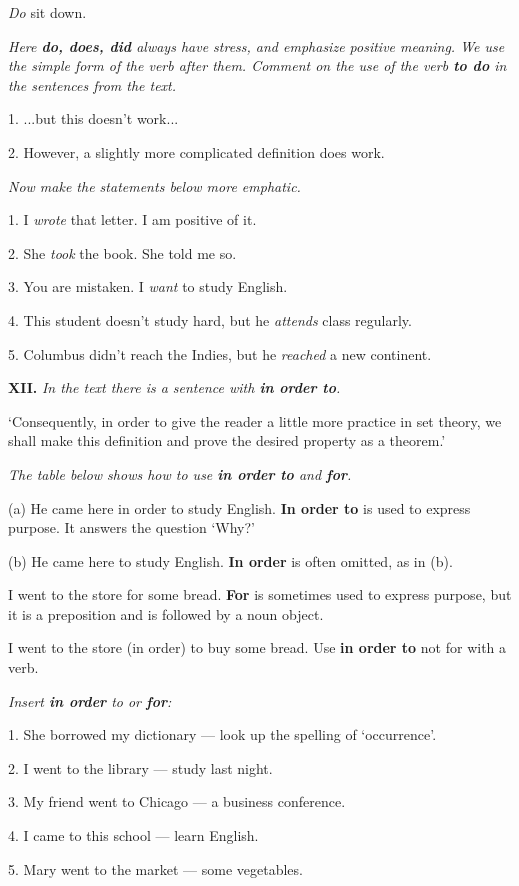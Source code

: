 \documentclass[a4paper]{article}
\newcommand{\ETask}[2]{\medskip\par\textbf{#1.} \textit{#2}\par}
\begin{document}
\textit{Do} sit down.

\textit{Here \textbf{do, does, did} always have stress, and emphasize positive meaning. We use the simple form of the verb after them.
Comment on the use of the verb \textbf{to do} in the sentences from the text.}

1. ...but this doesn't work...

2. However, a slightly more complicated definition does work.

\textit{Now make the statements below more emphatic.}

1. I \textit{wrote} that letter. I am positive of it.

2. She \textit{took} the book. She told me so.

3. You are mistaken. I \textit{want} to study English.

4. This student doesn't study hard, but he \textit{attends} class regularly.

5. Columbus didn't reach the Indies, but he \textit{reached} a new continent.

\ETask{XII}{In the text there is a sentence with \textbf{in order to}.}
`Consequently, in order to give the reader a little more practice in set theory, we shall make this definition and prove the
desired property as a theorem.'

\textit{The table below shows how to use \textbf{in order to} and \textbf{for}.}

(a) He came here in order to study English. \textbf{In order to} is used to express purpose. It answers the question `Why?'

(b) He came here to study English. \textbf{In order} is often omitted, as in (b).

I went to the store for some bread. \textbf{For} is sometimes used to express purpose, but it is a preposition and is
followed by a noun object.

I went to the store (in order) to buy some bread. Use \textbf{in order to} not for with a verb.

\textit{Insert \textbf{in order} to or \textbf{for}:}

1. She borrowed my dictionary --- look up the spelling of `occurrence'.

2. I went to the library --- study last night.

3. My friend went to Chicago --- a business conference.

4. I came to this school --- learn English.

5. Mary went to the market --- some vegetables.
\end{document}
